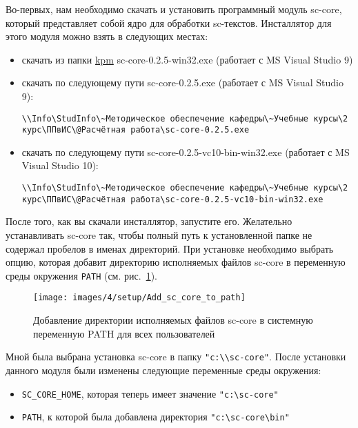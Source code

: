 Во-первых, нам необходимо скачать и установить программный модуль
sc-core, который представляет собой ядро для обработки
sc-текстов. Инсталлятор для этого модуля можно взять в следующих
местах:

\begin{itemize}
\item скачать из папки
  \href{http://sourceforge.net/projects/ostis/files/kpm/}{kpm}
  sc-core-0.2.5-win32.exe (работает с MS Visual Studio 9)
\item скачать по следующему пути sc-core-0.2.5.exe (работает с MS
  Visual Studio 9):
\begin{verbatim}
\\Info\StudInfo\~Методическое обеспечение кафедры\~Учебные курсы\2 курс\ППвИС\@Расчётная работа\sc-core-0.2.5.exe
\end{verbatim}
\item скачать по следующему пути sc-core-0.2.5-vc10-bin-win32.exe
  (работает с MS Visual Studio 10):
\begin{verbatim}
\\Info\StudInfo\~Методическое обеспечение кафедры\~Учебные курсы\2 курс\ППвИС\@Расчётная работа\sc-core-0.2.5-vc10-bin-win32.exe
\end{verbatim}
\end{itemize}

После того, как вы скачали инсталлятор, запустите его. Желательно
устанавливать sc-core так, чтобы полный путь к установленной папке не
содержал пробелов в именах директорий. При установке необходимо
выбрать опцию, которая добавит директорию исполняемых файлов sc-core в
переменную среды окружения \verb+PATH+ (см. рис.~\ref{fig:Add_sc_core_to_path}).

\begin{figure}[h]
  \centering
  \texttt{[image: images/4/setup/Add\_sc\_core\_to\_path]}
  \caption{Добавление директории исполняемых файлов sc-core в
    системную переменную PATH для всех пользователей}
  \label{fig:Add_sc_core_to_path}
\end{figure}
 
Мной была выбрана установка sc-core в папку
\verb+"c:\\sc-core"+. После установки данного модуля были изменены
следующие переменные среды окружения:
\begin{itemize}
\item \verb+SC_CORE_HOME+, которая теперь имеет значение
  \verb+"c:\sc-core"+
\item \verb+PATH+, к которой была добавлена директория
  \verb+"c:\sc-core\bin"+
\end{itemize}

